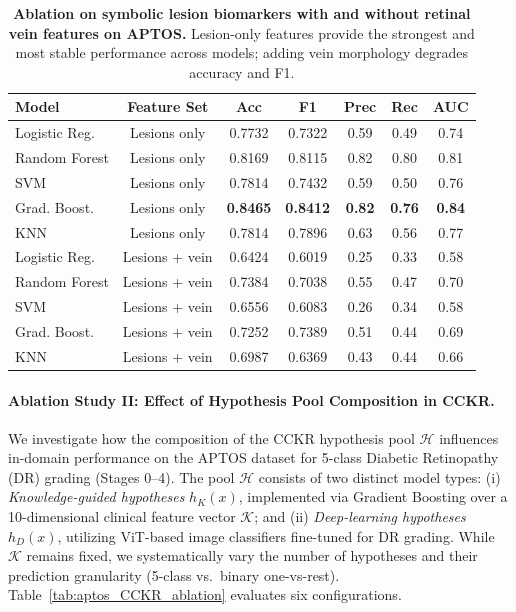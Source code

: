 \documentclass{article}
\begin{document}
\begin{table}[!htbp]
\centering
\scriptsize
\vspace{0.25em}
\setlength{\tabcolsep}{3pt}
\caption{\textbf{Ablation on symbolic lesion biomarkers with and without retinal vein features on APTOS.} Lesion-only features provide the strongest and most stable performance across models; adding vein morphology degrades accuracy and F1.}
\begin{tabular}{l|c|c|c|c|c|c}
\toprule
\textbf{Model} & \textbf{Feature Set} & \textbf{Acc} & \textbf{F1} & \textbf{Prec} & \textbf{Rec} & \textbf{AUC} \\
\midrule
Logistic Reg. & Lesions only      & 0.7732 & 0.7322 & 0.59 & 0.49 & 0.74 \\
Random Forest & Lesions only      & 0.8169 & 0.8115 & 0.82 & 0.80 & 0.81 \\
SVM           & Lesions only      & 0.7814 & 0.7432 & 0.59 & 0.50 & 0.76 \\
Grad. Boost.  & Lesions only      & \textbf{0.8465} & \textbf{0.8412} & \textbf{0.82} & \textbf{0.76} & \textbf{0.84} \\
KNN           & Lesions only      & 0.7814 & 0.7896 & 0.63 & 0.56  & 0.77 \\
\midrule
Logistic Reg. & Lesions + vein    & 0.6424 & 0.6019 & 0.25 & 0.33 & 0.58 \\
Random Forest & Lesions + vein    & 0.7384 & 0.7038 & 0.55 & 0.47 & 0.70 \\
SVM           & Lesions + vein    & 0.6556 & 0.6083 & 0.26 & 0.34  & 0.58 \\
Grad. Boost.  & Lesions + vein    & 0.7252 & 0.7389 & 0.51 & 0.44 & 0.69 \\
KNN           & Lesions + vein    & 0.6987 & 0.6369 & 0.43 & 0.44 & 0.66 \\
\bottomrule
\end{tabular}

\label{tab:ablation_symbolic}
\end{table}
\vspace{-0.30in}
\paragraph{Ablation Study II: Effect of Hypothesis Pool Composition in CCKR.}
We investigate how the composition of the CCKR hypothesis pool $\mathcal{H}$ influences in-domain performance on the APTOS dataset for 5-class Diabetic Retinopathy (DR) grading (Stages 0--4). The pool $\mathcal{H}$ consists of two distinct model types: 
(i) \textit{Knowledge-guided hypotheses} $h_{K}(x)$, implemented via Gradient Boosting over a 10-dimensional clinical feature vector $\mathcal{K}$; and 
(ii) \textit{Deep-learning hypotheses} $h_{D}(x)$, utilizing ViT-based image classifiers fine-tuned for DR grading. 
While $\mathcal{K}$ remains fixed, we systematically vary the number of hypotheses and their prediction granularity (5-class vs.\ binary one-vs-rest). Table~\ref{tab:aptos_CCKR_ablation} evaluates six configurations.
\end{document}
